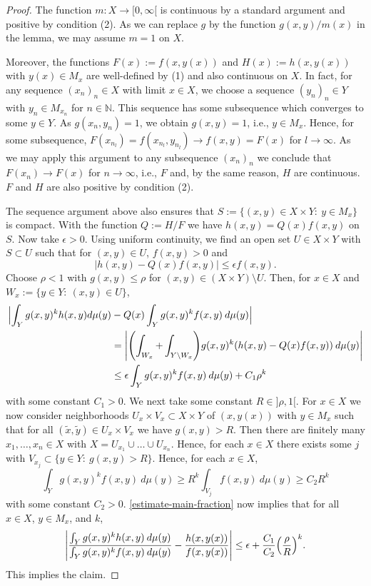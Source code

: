 \documentclass[reqno]{amsart}
\theoremstyle{plain}
\theoremstyle{definition}
\numberwithin{equation}{section}
\begin{document}
\begin{proof} The function $m:X\to[0,\infty[$ is continuous by a standard argument and positive by condition (2).
      As we can replace  $g$ by the function $g(x,y)/m(x)$ in the lemma, we may assume
      $m= 1$ on $X$.
      
Moreover, the functions  $F(x):= f(x,y(x))$ and $H(x):= h(x,y(x))$
with $y(x)\in M_x$   are well-defined by (1) and also continuous on $X$. In fact, 
  for any sequence $(x_n)_n\in X$ with limit $x\in X$, we 
  choose a sequence $(y_n)_n\in Y$ with $y_n\in M_{x_n}$ for $n\in\mathbb N$.
  This sequence has some subsequence which converges to
some $y\in Y$. As $g(x_n,y_n)=1$, we obtain $g(x,y)=1$, i.e., $y\in M_x$. Hence, for some subsequence,
$F(x_{n_l})=f(x_{n_l},y_{n_l})\to f(x,y)=F(x)$ for $l\to\infty$. As we may apply this argument to any subsequence
$(x_n)_n$ we conclude that $F(x_n)\to F(x)$ for $n\to\infty$, i.e., $F$ and, by the same reason, $H$ are continuous.
$F$ and $H$  are also positive by condition (2).

The sequence argument above  also ensures that  $S:=\{(x,y)\in X\times Y: \> y\in M_x\}$ is compact.
With the function  $Q:=H/F$  we have $h(x,y)= Q(x)f(x,y)$ on  $S$.
Now take $\epsilon>0$. Using uniform continuity, we find
an open set $U\in  X\times Y$ with $S\subset U$ such that for $(x,y)\in U$, $f(x,y)>0$ and
 $$|h(x,y)-Q(x)f(x,y)|\le \epsilon f(x,y).$$
Choose $\rho<1$ with $g(x,y)\le \rho$ for $(x,y)\in (X\times Y)\setminus U$.
Then, for $x\in X$ and $W_x:=\{y\in Y:\> (x,y)\in U\}$,
\begin{align}\label{estimate-main-fraction}
\Bigl|\int_Y g(x,y)^k h(x,y)d\mu(y)&- Q(x)\int_Y g(x,y)^k f(x,y)\> d\mu(y)\Bigr| \\
  &=
\Biggl|\Biggl(\int_{W_x}+ \int_{Y\setminus W_x}\Biggr) g(x,y)^k (h(x,y)- Q(x)f(x,y))\> d\mu(y)\Biggl|\notag\\
&\le   \epsilon \int_Y g(x,y)^k f(x,y) \> d\mu(y) + C_1 \rho^k
\notag\end{align}
with some constant  $C_1>0$. We next take some constant $R\in]\rho,1[$. For $x\in X$ we now consider neighborhoods
      $U_x\times V_x\subset X\times Y$ of
      $(x,y(x))$ with $y\in M_x$  such that for all $(\tilde x,\tilde y)\in U_x\times V_x$ we have $g(x,y)>R$.
      Then there are finitely many $x_1,\ldots,x_n\in X$ with $X=U_{x_1}\cup\ldots\cup U_{x_n}$.
      Hence, for each $x\in X$ there exists some $j$ with $V_{x_j}\subset\{y\in Y:\> g(x,y)>R\}$. Hence, for each $x\in X$,
      $$\int_Y g(x,y)^k f(x,y) \> d\mu(y)\ge R^k\int_{V_j} f(x,y) \> d\mu(y)\ge C_2 R^k$$
      with some constant $C_2>0$.  \eqref{estimate-main-fraction} now implies 
      that for all $x\in X$, $y\in M_x$, and $k$,
      $$\Biggl|\frac{\int_Y g(x,y)^k h(x,y)\> d\mu(y)}{\int_Y g(x,y)^k f(x,y)\> d\mu(y)} - \frac{h(x,y(x))}{f(x,y(x))}\Biggr|\le \epsilon + \frac{C_1}{C_2} \Bigl(\frac{\rho}{R}\Bigr)^k.$$
      This implies the claim.
      \end{proof}
\end{document}
